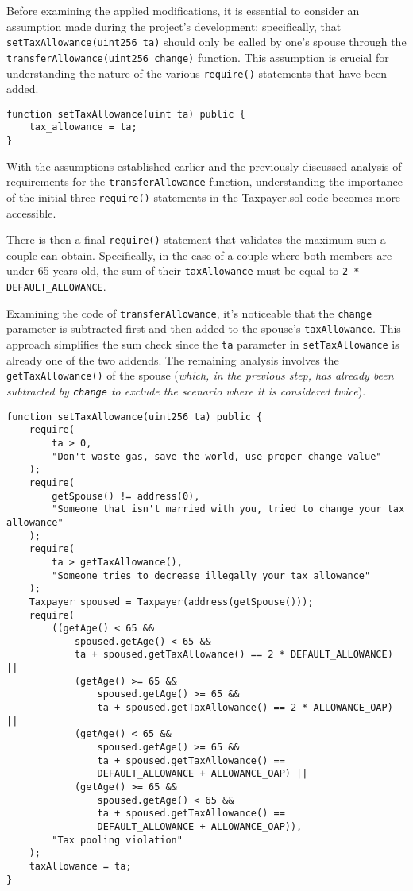 \documentclass{article}
\begin{document}
Before examining the applied modifications, it is essential to consider an assumption made during the project's development: specifically, that \texttt{setTaxAllowance(uint256 ta)} should only be called by one's spouse through the \texttt{transferAllowance(uint256 change)} function. This assumption is crucial for understanding the nature of the various \texttt{require()} statements that have been added.
\begin{verbatim}
function setTaxAllowance(uint ta) public {
    tax_allowance = ta;
}
\end{verbatim}
With the assumptions established earlier and the previously discussed analysis of requirements for the \texttt{transferAllowance} function, understanding the importance of the initial three \texttt{require()} statements in the Taxpayer.sol code becomes more accessible.

There is then a final \texttt{require()} statement that validates the maximum sum a couple can obtain. Specifically, in the case of a couple where both members are under 65 years old, the sum of their \texttt{taxAllowance} must be equal to \texttt{2 * DEFAULT\_ALLOWANCE}.

Examining the code of \texttt{transferAllowance}, it's noticeable that the \texttt{change} parameter is subtracted first and then added to the spouse's \texttt{taxAllowance}. This approach simplifies the sum check since the \texttt{ta} parameter in \texttt{setTaxAllowance}  is already one of the two addends. The remaining analysis involves the \texttt{getTaxAllowance()}  of the spouse (\textit{which, in the previous step, has already been subtracted by \texttt{change} to exclude the scenario where it is considered twice}).
\begin{verbatim}
function setTaxAllowance(uint256 ta) public {
    require(
        ta > 0,
        "Don't waste gas, save the world, use proper change value"
    );
    require(
        getSpouse() != address(0),
        "Someone that isn't married with you, tried to change your tax allowance"
    );
    require(
        ta > getTaxAllowance(),
        "Someone tries to decrease illegally your tax allowance"
    );
    Taxpayer spoused = Taxpayer(address(getSpouse()));
    require(
        ((getAge() < 65 &&
            spoused.getAge() < 65 &&
            ta + spoused.getTaxAllowance() == 2 * DEFAULT_ALLOWANCE) ||
            (getAge() >= 65 &&
                spoused.getAge() >= 65 &&
                ta + spoused.getTaxAllowance() == 2 * ALLOWANCE_OAP) ||
            (getAge() < 65 &&
                spoused.getAge() >= 65 &&
                ta + spoused.getTaxAllowance() ==
                DEFAULT_ALLOWANCE + ALLOWANCE_OAP) ||
            (getAge() >= 65 &&
                spoused.getAge() < 65 &&
                ta + spoused.getTaxAllowance() ==
                DEFAULT_ALLOWANCE + ALLOWANCE_OAP)),
        "Tax pooling violation"
    );
    taxAllowance = ta;
}
\end{verbatim}
\end{document}
